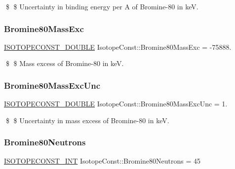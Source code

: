 \$ \$ Uncertainty in binding energy per A of Bromine-\/80 in keV. \mbox{\label{group___isotope_const-_bromine-_br80_gafd71e3030727a2eaa5096cdf17df38ea}} 
\subsubsection{\texorpdfstring{Bromine80\+Mass\+Exc}{Bromine80MassExc}}
{\footnotesize\ttfamily \mbox{\hyperlink{group___isotope_const-_macros_ga8f45a7272ce02c0b4c65c44636ed719a}{I\+S\+O\+T\+O\+P\+E\+C\+O\+N\+S\+T\+\_\+\+D\+O\+U\+B\+LE}} Isotope\+Const\+::\+Bromine80\+Mass\+Exc = -\/75888.}

\$ \$ Mass excess of Bromine-\/80 in keV. \mbox{\label{group___isotope_const-_bromine-_br80_ga5713be0168c3f8d4ba11adcf6ccc6139}} 
\subsubsection{\texorpdfstring{Bromine80\+Mass\+Exc\+Unc}{Bromine80MassExcUnc}}
{\footnotesize\ttfamily \mbox{\hyperlink{group___isotope_const-_macros_ga8f45a7272ce02c0b4c65c44636ed719a}{I\+S\+O\+T\+O\+P\+E\+C\+O\+N\+S\+T\+\_\+\+D\+O\+U\+B\+LE}} Isotope\+Const\+::\+Bromine80\+Mass\+Exc\+Unc = 1.}

\$ \$ Uncertainty in mass excess of Bromine-\/80 in keV. \mbox{\label{group___isotope_const-_bromine-_br80_ga8b915f8b8d4cd37cf963296dd3164444}} 
\subsubsection{\texorpdfstring{Bromine80\+Neutrons}{Bromine80Neutrons}}
{\footnotesize\ttfamily \mbox{\hyperlink{group___isotope_const-_macros_ga5f18360b3e99483a35c32d789e62621c}{I\+S\+O\+T\+O\+P\+E\+C\+O\+N\+S\+T\+\_\+\+I\+NT}} Isotope\+Const\+::\+Bromine80\+Neutrons = 45}

